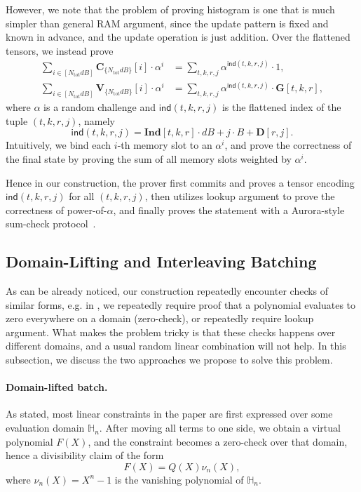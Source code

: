 However, we note that the problem of proving histogram is one
  that is much simpler than general RAM argument, since the update pattern is fixed and known in advance, and the update operation is just addition.
  Over the flattened tensors, we instead prove
  \begin{align}
    \sum_{i\in [N_{\mathrm{tot}}dB]} \mathbf{C}_{\{N_{\mathrm{tot}}dB\}}[i]\cdot \alpha^i &= \sum_{t, k, r, j} \alpha^{\mathsf{ind}(t, k, r, j)}\cdot 1,\\
    \sum_{i\in [N_{\mathrm{tot}}dB]} \mathbf{V}_{\{N_{\mathrm{tot}}dB\}}[i]\cdot \alpha^i &= \sum_{t, k, r, j} \alpha^{\mathsf{ind}(t, k, r, j)}\cdot \mathbf{G}[t, k, r],
  \end{align}
  where $\alpha$ is a random challenge and $\mathsf{ind}(t, k, r, j)$ is the flattened index of the tuple $(t, k, r, j)$,
  namely
  \[\mathsf{ind}(t, k, r, j) = \mathbf{Ind}[t, k, r]\cdot dB + j\cdot B + \mathbf{D}[r, j].\]
  Intuitively, we bind each $i$-th memory slot to an $\alpha^i$,
  and prove the correctness of the final state by proving the sum of all memory slots weighted by $\alpha^i$.
  
Hence in our construction, the prover
  first commits and proves a tensor encoding $\mathsf{ind}(t, k, r, j)$
  for all $(t, k, r, j)$,
  then utilizes lookup argument to prove the correctness of power-of-$\alpha$,
  and finally proves the statement with a Aurora-style sum-check protocol~\cite{aurora19}.

\subsection{Domain-Lifting and Interleaving Batching}

As can be already noticed, our construction repeatedly 
encounter checks of similar forms, e.g. in ,
we repeatedly require proof that a polynomial evaluates to zero
everywhere on a domain (zero-check), or repeatedly require lookup argument.
What makes the problem tricky is that these checks
happens over different domains, and a usual random linear
combination will not help.
In this subsection, we discuss the two approaches
we propose to solve this problem.

\paragraph{Domain-lifted batch.}
As stated, most linear constraints in the paper are first expressed over some evaluation
domain $\mathbb{H}_n$. After moving all terms to one side, we obtain a virtual
polynomial $F(X)$, and the constraint becomes a zero-check over that domain,
hence a divisibility claim of the form
\[
F(X)=Q(X)\nu_n(X),
\]
where $\nu_n(X)=X^n-1$ is the vanishing polynomial of $\mathbb{H}_n$.

